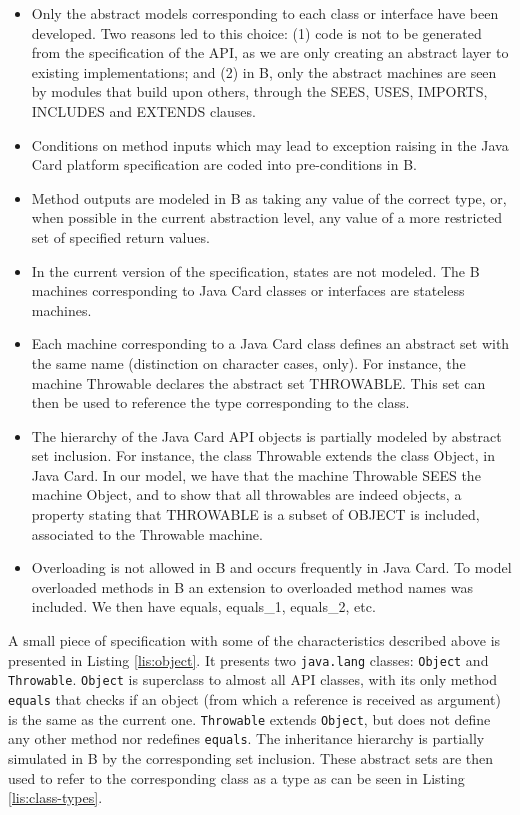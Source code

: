 \documentclass{entcs}
\begin{document}
\begin{itemize}

\item Only the abstract models corresponding to each class or
  interface have been developed. Two reasons led to this choice: (1)
  code is not to be generated from the specification of the API, as we
  are only creating an abstract layer to existing implementations; and
  (2) in B, only the abstract machines are seen by modules that build
  upon others, through the SEES, USES, IMPORTS, INCLUDES and EXTENDS
  clauses.

\item Conditions on method inputs which may lead to exception raising
  in the Java Card platform specification are coded into
  pre-conditions in B.
  
\item Method outputs are modeled in B as taking any value of the
  correct type, or, when possible in the current abstraction level,
  any value of a more restricted set of specified return values.
  
  \item In the current version of the specification, states are not modeled. 
  The B machines corresponding to Java Card classes or interfaces are stateless machines. 
  
\item Each machine corresponding to a Java Card class defines an
  abstract set with the same name (distinction on character cases,
  only). For instance, the machine Throwable declares the abstract set
  THROWABLE. This set can then be used to reference the type
  corresponding to the class.

\item The hierarchy of the Java Card API objects is partially modeled
  by abstract set inclusion. For instance, the class Throwable extends
  the class Object, in Java Card. In our model, we  have that the
  machine Throwable SEES the machine Object, and to show that all throwables are indeed
  objects, a property stating that THROWABLE is a subset of OBJECT is
  included, associated to the Throwable machine.

\item Overloading is not allowed in B and occurs frequently in Java
  Card. To model overloaded methods in B an extension to overloaded
  method names was included. We then have equals, equals\_1,
  equals\_2, etc.
\end{itemize}

A small piece of specification with some of the characteristics described above is presented in Listing \ref{lis:object}. It presents two \texttt{java.lang} classes: \texttt{Object} and \texttt{Throwable}.  \texttt{Object} is  superclass to almost all API classes, with its only method  \texttt{equals} that checks if an object (from which a reference is received as argument) is the same as the current one. \texttt{Throwable} extends \texttt{Object}, but does not define any other method nor redefines \texttt{equals}. The inheritance hierarchy is partially simulated in B by the corresponding set inclusion. These abstract sets are then used to refer to the corresponding class as a type as can be seen in Listing \ref{lis:class-types}.
\end{document}
